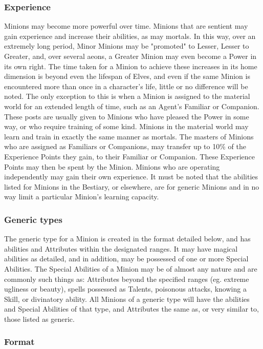 \subsubsection{Experience}
Minions may become more powerful over time.  Minions that are sentient
may gain experience and increase their abilities, as may mortals.  In
this way, over an extremely long period, Minor Minions may be
"promoted" to Lesser, Lesser to Greater, and, over several aeons, a
Greater Minion may even become a Power in its own right.  The time
taken for a Minion to achieve these increases in its home dimension is
beyond even the lifespan of Elves, and even if the same Minion is
encountered more than once in a character's life, little or no
difference will be noted.  The only exception to this is when a Minion
is assigned to the material world for an extended length of time, such
as an Agent's Familiar or Companion. These posts are usually given to
Minions who have pleased the Power in some way, or who require
training of some kind.  Minions in the material world may learn and
train in exactly the same manner as mortals.  The masters of Minions
who are assigned as Familiars or Companions, may transfer up to 10\% of
the Experience Points they gain, to their Familiar or Companion.
These Experience Points may then be spent by the Minion.  Minions who
are operating independently may gain their own experience.  It must be
noted that the abilities listed for Minions in the Bestiary, or
elsewhere, are for generic Minions and in no way limit a particular
Minion's learning capacity.

\subsubsection{Generic types}
The generic type for a Minion is created in the format detailed below,
and has abilities and Attributes within the designated ranges.  It may
have magical abilities as detailed, and in addition, may be possessed
of one or more Special Abilities.  The Special Abilities of a Minion
may be of almost any nature and are commonly such things as:
Attributes beyond the specified ranges (eg. extreme ugliness or
beauty), spells possessed as Talents, poisonous attacks, knowing a
Skill, or divinatory ability.  All Minions of a generic type will have
the abilities and Special Abilities of that type, and Attributes the
same as, or very similar to, those listed as generic.
 
\subsubsection{Format}

